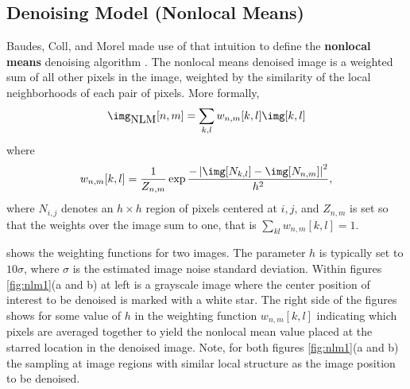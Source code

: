 \subsection{Denoising Model (Nonlocal Means)}

Baudes, Coll, and Morel made use of that intuition to define the {\bf nonlocal means} denoising algorithm \cite{Baudes2005}. 
The nonlocal means denoised image is a weighted sum of all other pixels in the image, weighted by the similarity of the local neighborhoods of each pair of pixels.  More formally, 
\begin{equation}
    \img_{\mbox{NLM}}[n,m] = \sum_{k,l} w_{n,m}[k,l] \img [k,l]
\end{equation}
where
\begin{equation}
    w_{n,m}[k,l] = \frac{1}{Z_{n,m}} \exp{\frac{- \left| \img [N_{k,l}] - \img [N_{n,m}] \right| ^2}{h^2}},
    \label{fig:mask}
\end{equation}
where $N_{i, j}$ denotes an $h \times h$ region of pixels centered at $i, j$, and $Z_{n,m}$ is set so that the weights over the image sum to one, that is $\sum_{kl} w_{n,m}[k,l] = 1$.






\Fig{\ref{fig:nlm1}} shows the weighting functions for two images. The parameter $h$ is typically set to $10 \sigma $, where $\sigma$ is the estimated image noise standard deviation. Within figures \ref{fig:nlm1}(a and b) at left is a grayscale image where the center position of interest to be denoised is marked with a white star.  The right side of the figures shows for some value of $h$ in \eqn{\ref{fig:mask}} the weighting function $w_{n,m}[k,l]$ indicating which pixels are averaged together to yield the nonlocal mean value placed at the starred location in the denoised image.  Note, for both figures \ref{fig:nlm1}(a and b) the sampling at image regions with similar local structure as the image position to be denoised.


